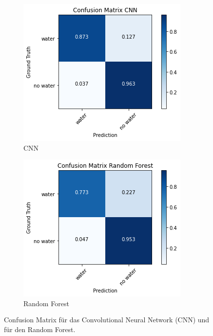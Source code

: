 \begin{figure}
    \centering
    \begin{subfigure}{0.4\textwidth}
        \centering
        \includegraphics[width=\textwidth]{content/img/confusion_cnn.png}
        \caption{CNN}
    \end{subfigure}
    \begin{subfigure}{0.4\textwidth}
        \centering
        \includegraphics[width=\textwidth]{content/img/confusion_forest.png}
        \caption{Random Forest}
    \end{subfigure}
    \caption{Confusion Matrix für das Convolutional Neural Network (CNN) und für den Random Forest.}
    \label{fig:confusion}
\end{figure}
